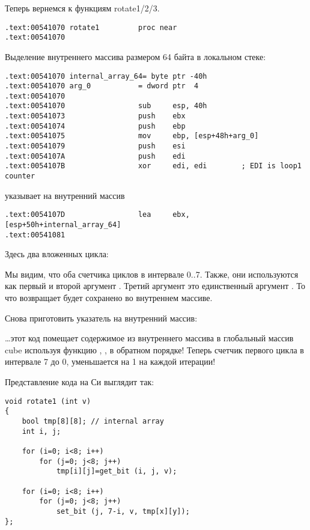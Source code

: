 Теперь вернемся к функциям rotate1/2/3.

\begin{lstlisting}[style=customasm]
.text:00541070 rotate1         proc near
.text:00541070
\end{lstlisting}

Выделение внутреннего массива размером 64 байта в локальном стеке:

\begin{lstlisting}[style=customasm]
.text:00541070 internal_array_64= byte ptr -40h
.text:00541070 arg_0           = dword ptr  4
.text:00541070
.text:00541070                 sub     esp, 40h
.text:00541073                 push    ebx
.text:00541074                 push    ebp
.text:00541075                 mov     ebp, [esp+48h+arg_0]
.text:00541079                 push    esi
.text:0054107A                 push    edi
.text:0054107B                 xor     edi, edi        ; EDI is loop1 counter
\end{lstlisting}

\EBX указывает на внутренний массив

\begin{lstlisting}[style=customasm]
.text:0054107D                 lea     ebx, [esp+50h+internal_array_64]
.text:00541081
\end{lstlisting}

Здесь два вложенных цикла:



Мы видим, что оба счетчика циклов в интервале 0..7. 
Также, они используются как первый и второй аргумент .
Третий аргумент  это единственный аргумент . 
То что возвращает  будет сохранено во внутреннем массиве.

Снова приготовить указатель на внутренний массив:



\dots этот код помещает содержимое из внутреннего массива в глобальный массив cube используя функцию 
, , в обратном порядке!
Теперь счетчик первого цикла в интервале 7 до 0, уменьшается на 1 на каждой итерации!

Представление кода на Си выглядит так:

\begin{lstlisting}[style=customc]
void rotate1 (int v)
{
	bool tmp[8][8]; // internal array
	int i, j;

	for (i=0; i<8; i++)
		for (j=0; j<8; j++)
			tmp[i][j]=get_bit (i, j, v);

	for (i=0; i<8; i++)
		for (j=0; j<8; j++)
			set_bit (j, 7-i, v, tmp[x][y]);
};
\end{lstlisting}

